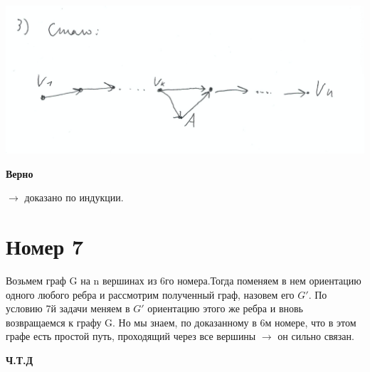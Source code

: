 \documentclass[a4paper,12pt]{article}
\begin{document}
\begin{enumerate}
\begin{center}
\includegraphics[scale=0.4]{6.3.png}
\end{center}
\begin{center}
\textbf{Верно}
\end{center}
\end{enumerate}
$\rightarrow$ доказано по индукции.

\section*{Номер 7 }
Возьмем граф G на n вершинах из 6го номера.Тогда поменяем в нем ориентацию одного любого ребра и рассмотрим полученный граф, назовем его $G'$. По условию 7й задачи меняем в $G'$ ориентацию этого же ребра и вновь возвращаемся к графу G. Но мы знаем, по доказанному в 6м номере, что в этом графе есть простой путь, проходящий через все вершины $\rightarrow$ он сильно связан.
\begin{center}
\textbf{Ч.Т.Д}
\end{center}
\end{document}
